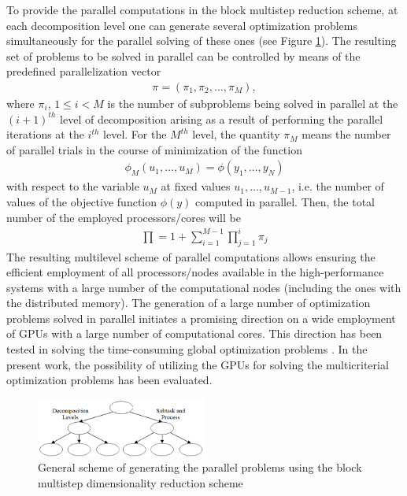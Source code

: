 \documentclass[runningheads]{llncs}
\begin{document}
To provide the parallel computations in the block multistep reduction scheme, at each decomposition level one can generate several optimization problems simultaneously for the parallel solving of these ones \cite{c34,c36} (see Figure \ref{fig:01}). The resulting set of problems to be solved in parallel can be controlled by means of the predefined parallelization vector
\begin{eqnarray} \label{eq:14}
\pi = (\pi_1, \pi_2, \dots, \pi_M),
\end{eqnarray}
where $\pi_i$, $1 \leq i < M$ is the number of subproblems being solved in parallel at the $(i+1)^{th}$ level of decomposition arising as a result of performing the parallel iterations at the $i^{th}$ level. For the $M^{th}$ level, the quantity $\pi_M$ means the number of parallel trials in the course of minimization of the function 
\begin{eqnarray}
\phi_M(u_1, \dots, u_M) = \phi(y_1, \dots, y_N)
\end{eqnarray}
with respect to the variable $u_M$ at fixed values $u_1, \dots, u_{M-1}$, i.e. the number of values of the objective function $\phi(y)$ computed in parallel. Then, the total number of the employed processors/cores will be 
\begin{eqnarray} \label{eq:15}
\prod{} = 1 + \sum_{i=1}^{M-1}\prod_{j=1}^i{\pi_j}
\end{eqnarray}
The resulting multilevel scheme of parallel computations allows ensuring the efficient employment of all processors/nodes available in the high-performance systems with a large number of the computational nodes (including the ones with the distributed memory). The generation of a large number of optimization problems solved in parallel initiates a promising direction on a wide employment of GPUs with a large number of computational cores. This direction has been tested in solving the time-consuming global optimization problems \cite{c38,c39,c40}. In the present work, the possibility of utilizing the GPUs for solving the multicriterial optimization problems has been evaluated.

\begin{figure}[htbp]
\centerline{\includegraphics[width=0.5\textwidth]{fig1.png}}
\caption{General scheme of generating the parallel problems using the block multistep dimensionality reduction scheme}
\label{fig:01}
\end{figure}
\end{document}
